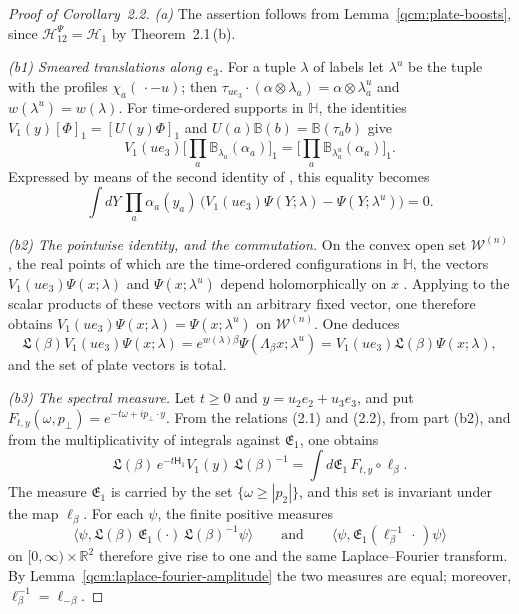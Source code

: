 \documentclass[11pt,letterpaper,reqno]{amsart}
\theoremstyle{definition}
\begin{document}
\begin{proof}[Proof of Corollary~2.2]
\emph{(a)} The assertion follows from Lemma~\ref{qcm:plate-boosts}, since $\mathcal H^{\Psi}_{12}=\mathcal H_1$ by Theorem~2.1\,(b).

\emph{(b1) Smeared translations along $e_3$.}
For a tuple $\lambda$ of labels let $\lambda^u$ be the tuple with the profiles $\chi_a(\,\cdot-u)$; then $\tau_{ue_3}\cdot(\alpha\otimes\lambda_a)=\allowbreak \alpha\otimes\lambda_a^u$ and $w(\lambda^u)=w(\lambda)$.
For time-ordered supports in $\mathbb H$, the identities $V_1(y)[\Phi]_1=[U(y)\Phi]_1$ and $U(a)\mathbb B(b)=\mathbb B(\tau_a b)$ give
\begin{equation*}
V_1(ue_3)\Big[\prod_a\mathbb B_{\lambda_a}(\alpha_a)\Big]_1=\Big[\prod_a\mathbb B_{\lambda_a^u}(\alpha_a)\Big]_1.
\end{equation*}
Expressed by means of the second identity of \cite[Proposition~8.3]{QEDConstruction}, this equality becomes
\begin{equation*}
\int dY\,\prod_a\alpha_a(y_a)\,\big(V_1(ue_3)\Psi(Y;\lambda)-\Psi(Y;\lambda^u)\big)=0.
\end{equation*}

\emph{(b2) The pointwise identity, and the commutation.}
On the convex open set $\mathcal W^{(n)}$, the real points of which are the time-ordered configurations in $\mathbb H$, the vectors $V_1(ue_3)\Psi(x;\lambda)$ and $\Psi(x;\lambda^u)$ depend holomorphically on $x$ \cite[Proposition~8.3]{QEDConstruction}.
Applying \cite[Section~8.3 and Proposition~8.3]{QEDConstruction} to the scalar products of these vectors with an arbitrary fixed vector, one therefore obtains $V_1(ue_3)\Psi(x;\lambda)=\Psi(x;\lambda^u)$ on $\mathcal W^{(n)}$.
One deduces
\begin{equation*}
\mathfrak L(\beta)V_1(ue_3)\Psi(x;\lambda)=e^{w(\lambda)\beta}\Psi(\Lambda_\beta x;\lambda^u)=V_1(ue_3)\mathfrak L(\beta)\Psi(x;\lambda),
\end{equation*}
and the set of plate vectors is total.

\emph{(b3) The spectral measure.}
Let $t\ge0$ and $y=u_2e_2+u_3e_3$, and put $F_{t,y}(\omega,p_\perp)=e^{-t\omega+ip_\perp\cdot y}$.
From the relations (2.1) and (2.2), from part (b2), and from the multiplicativity of integrals against $\mathfrak E_1$, one obtains
\begin{equation*}
\mathfrak L(\beta)\,e^{-t\mathsf H_1}V_1(y)\,\mathfrak L(\beta)^{-1}=\int d\mathfrak E_1\,F_{t,y}\circ\ell_\beta.
\end{equation*}
The measure $\mathfrak E_1$ is carried by the set $\{\omega\ge|p_2|\}$, and this set is invariant under the map $\ell_\beta$.
For each $\psi$, the finite positive measures
\begin{equation*}
\langle\psi,\mathfrak L(\beta)\,\mathfrak E_1(\cdot)\,\mathfrak L(\beta)^{-1}\psi\rangle\qquad\text{and}\qquad\langle\psi,\mathfrak E_1(\ell_\beta^{-1}\,\cdot\,)\psi\rangle
\end{equation*}
on $[0,\infty)\times\mathbb R^2$ therefore give rise to one and the same Laplace--Fourier transform.
By Lemma~\ref{qcm:laplace-fourier-amplitude} the two measures are equal; moreover, $\ell_\beta^{-1}=\ell_{-\beta}$.


\end{proof}
\end{document}
